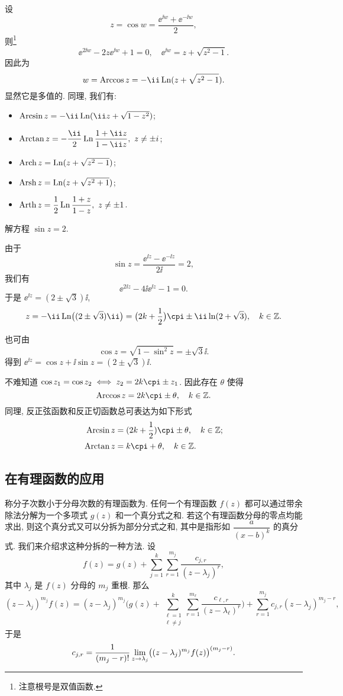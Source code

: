 设
\[
  z=\cos w=\frac{\ee^{\ii w}+\ee^{-\ii w}}2,\]
则\footnote{注意根号是双值函数.}
\[
  \ee^{2\ii w}-2z\ee^{\ii w}+1=0,\quad
  \ee^{\ii w}=z+\sqrt{z^2-1}.
\]
因此为
\[
  w=\Arccos z=-\ii \Ln(z+\sqrt{z^2-1}).
\]
显然它是多值的. 同理, 我们有:

\begin{itemize}
  \item {} $\Arcsin z=-\ii\Ln(\ii z+\sqrt{1-z^2})$;
  \item {} $\Arctan z=-\dfrac \ii 2\Ln\dfrac{1+\ii z}{1-\ii z},\ z\neq \pm i$;
  \item {} $\operatorname{Arch} z=\operatorname{Ln}(z+\sqrt{z^2-1})$;
  \item {} $\operatorname{Arsh} z=\operatorname{Ln}(z+\sqrt{z^2+1})$;
  \item {} $\Arth z=\dfrac12\Ln\dfrac{1+z}{1-z},\ z\neq \pm1$.
\end{itemize}

\begin{example}
  解方程 $\sin z=2$.
\end{example}

\begin{solution}
  由于
  \[
    \sin z=\frac{\ee^{\ii z}-\ee^{-\ii z}}{2\ii}=2,
  \]
  我们有
  \[
    \ee^{2\ii z}-4\ii\ee^{\ii z}-1=0.
  \]
  于是 $\ee^{\ii z}=(2\pm\sqrt 3)\ii$,
  \[
     z
    =-\ii\Ln\bigl((2\pm\sqrt 3)\ii\bigr)
    =\bigl(2k+\half\bigr)\cpi\pm \ii\ln(2+\sqrt3),
      \quad k\in\BZ.
  \]
\end{solution}

也可由
\[
  \cos z=\sqrt{1-\sin^2 z}=\pm\sqrt 3\ii.
\]
得到 $\ee^{\ii z}=\cos z+\ii\sin z=(2\pm\sqrt 3)\ii$.

不难知道 $\cos z_1=\cos z_2\iff z_2=2k\cpi\pm z_1$.
因此存在 $\theta$ 使得
\[
  \Arccos z=2k\cpi\pm \theta,\quad k\in\BZ.
\]
同理, 反正弦函数和反正切函数总可表达为如下形式
\begin{align*}
  \Arcsin z&=(2k+\half)\cpi\pm \theta,\quad k\in\BZ;\\
  \Arctan z&=k\cpi+\theta,\quad k\in\BZ.
\end{align*}


\subsection{在有理函数的应用}
\label{ssec:application-of-derivative}

称分子次数小于分母次数的有理函数为.
任何一个有理函数 $f(z)$ 都可以通过带余除法分解为一个多项式 $g(z)$ 和一个真分式之和.
若这个有理函数分母的零点均能求出, 则这个真分式又可以分拆为部分分式之和, 其中是指形如 $\dfrac{a}{(x-b)^k}$ 的真分式.
我们来介绍求这种分拆的一种方法.
设
\[
  f(z)=g(z)+\sum_{j=1}^k \sum_{r=1}^{m_j} \frac{c_{j,r}}{(z-\lambda_j)^r},
\]
其中 $\lambda_j$ 是 $f(z)$ 分母的 $m_j$ 重根.
那么
\[
   (z-\lambda_j)^{m_j}f(z)
  =(z-\lambda_j)^{m_j}\biggl(g(z)+\sum_{\substack{\ell=1\\\ell\neq j}}^k \sum_{r=1}^{m_\ell} \frac{c_{\ell,r}}{(z-\lambda_\ell)^r}\biggr)
    +\sum_{r=1}^{m_j} c_{j,r}(z-\lambda_j)^{m_j-r},
\]
于是
\[
  c_{j,r}=\frac1{(m_j-r)!}\lim_{z\rightarrow \lambda_j}
  \bigl((z-\lambda_j)^{m_j}f(z)\bigr)^{(m_j-r)}.
\]

